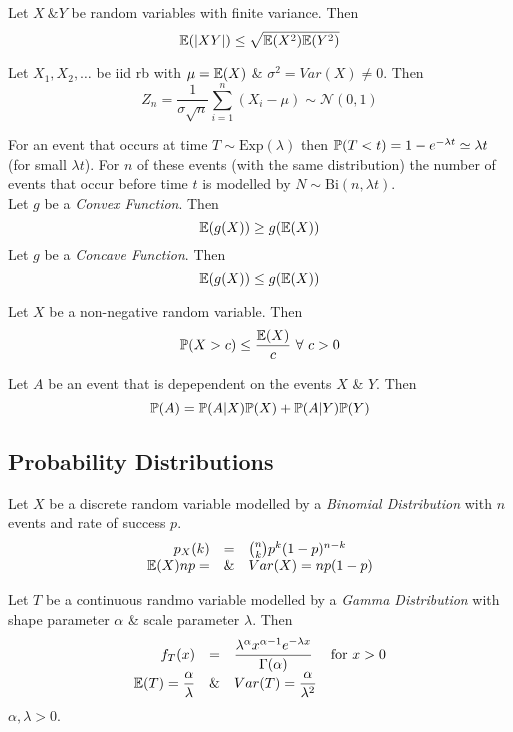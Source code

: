 \documentclass[11pt,a4paper]{article}
\begin{document}
Let $X\ \& Y$ be random variables with finite variance. Then
$$\mathbb{E}(|XY|)\leq\sqrt{\mathbb{E}(X^2)\mathbb{E}(Y^2)}$$

Let $X_1,X_2,\dots$ be iid rb with $\mu=\mathbb{E}(X)$ \& $\sigma^2=Var(X)\neq0$. Then
$$Z_n=\frac{1}{\sigma\sqrt{n}}\sum_{i=1}^n(X_i-\mu)\sim \mathcal{N}(0,1)$$

For an event that occurs at time $T\sim\mathrm{Exp}(\lambda)$ then $\mathbb{P}(T<t)=1-e^{-\lambda t}\simeq\lambda t$ (for small $\lambda t$). For $n$ of these events (with the same distribution) the number of events that occur before time $t$ is modelled by $N\sim\mathrm{Bi}(n,\lambda t)$.\\

Let $g$ be a \textit{Convex Function}. Then
$$\mathbb{E}(g(X))\geq g(\mathbb{E}(X))$$
Let $g$ be a \textit{Concave Function}. Then
$$\mathbb{E}(g(X))\leq g(\mathbb{E}(X))$$

Let $X$ be a non-negative random variable. Then
$$\prob(X>c)\leq\frac{\expect(X)}{c}\ \forall\ c>0$$

Let $A$ be an event that is depependent on the events $X$ \& $Y$. Then
$$\mathbb{P}(A)=\mathbb{P}(A|X)\mathbb{P}(X)+\mathbb{P}(A|Y)\mathbb{P}(Y)$$

\newpage
\subsection{Probability Distributions}

Let $X$ be a discrete random variable modelled by a \textit{Binomial Distribution} with $n$ events and rate of success $p$.\\
\[\begin{array}{rcl}
p_X(k)&=&{n\choose k}p^k(1-p)^{n-k}\\
\mathbb{E}(X)np=&\&&Var(X)=np(1-p)
\end{array}\]

Let $T$ be a continuous randmo variable modelled by a \textit{Gamma Distribution} with shape parameter $\alpha$ \& scale parameter $\lambda$. Then
\[\begin{array}{rcll}
f_T(x)&=&\dfrac{\lambda^\alpha x^{\alpha-1}e^{-\lambda x}}{\Gamma(\alpha)}&\mathrm{for\ }x>0\\
\mathbb{E}(T)=\dfrac{\alpha}{\lambda}&\&&Var(T)=\dfrac{\alpha}{\lambda^2}
\end{array}\]
\nb $\alpha,\lambda>0$.\\
\end{document}
